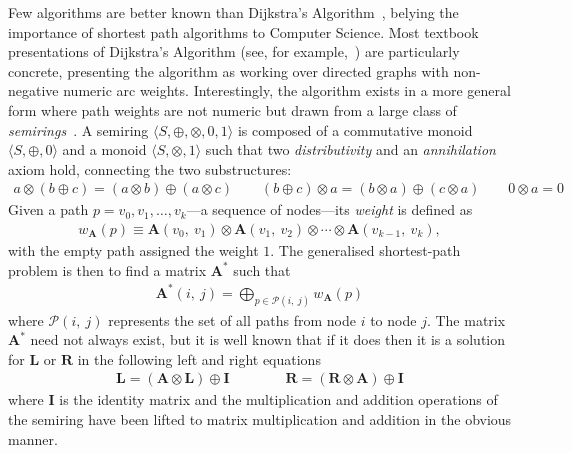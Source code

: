Few algorithms are better known than Dijkstra's Algorithm~\cite{dijkstra:note:1959}, belying the importance of shortest path algorithms to Computer Science.
Most textbook presentations of Dijkstra's Algorithm (see, for example,~\cite[Chapter 24]{clrs}) are particularly concrete, presenting the algorithm as working over directed graphs with non-negative numeric arc weights.
Interestingly, the algorithm exists in a more general form where path weights are not numeric but drawn from a large class of \emph{semirings}~\cite{gondran_graphs_2008, mohri:semiring:2002}.
A semiring $\langle S, \oplus, \otimes, 0, 1 \rangle$ is composed of a commutative monoid $\langle S, \oplus, 0\rangle$ and a monoid $\langle S, \otimes, 1\rangle$ such that two \emph{distributivity} and an \emph{annihilation} axiom hold, connecting the two substructures:
\begin{gather*}
a\otimes (b \oplus c) = (a\otimes b) \oplus (a\otimes c) \qquad
(b \oplus c) \otimes a = (b\otimes a) \oplus (c\otimes a) \qquad
0 \otimes a = 0
\end{gather*}
\noindent
Given a path $p = v_0, v_1, \ldots, v_k$---a sequence of nodes---its \emph{weight} is defined as
\begin{gather*}
    w_{\mathbf{A}}(p)
    \equiv
    \mathbf{A}(v_0,\ v_1)
    \otimes \mathbf{A}(v_1,\ v_2)
    \otimes \cdots
    \otimes \mathbf{A}(v_{k-1},\ v_k),
\end{gather*}
with the empty path assigned the weight $1$.
The generalised shortest-path problem is then to find a matrix $\mathbf{A}^*$ such that
\begin{gather*}
\label{eq:global}
\mathbf{A}^*(i,\ j) = \displaystyle\bigoplus_{p \in \mathcal{P}(i,\ j)} w_{\mathbf{A}}(p)
\end{gather*}
where $\mathcal{P}(i,\ j)$ represents the set of all paths from node $i$ to node $j$.
The matrix $\mathbf{A}^*$ need not always exist, but it is well known that if it does then it is a solution for $\mathbf{L}$ or $\mathbf{R}$ in the following left and right equations
\begin{gather*}
\mathbf{L} = (\mathbf{A} \otimes \mathbf{L}) \oplus \mathbf{I} \qquad\qquad
\mathbf{R} = (\mathbf{R} \otimes \mathbf{A}) \oplus \mathbf{I}
\end{gather*}
where $\mathbf{I}$ is the identity matrix and the multiplication and addition operations of the semiring have been lifted to matrix multiplication and addition in the obvious manner.

